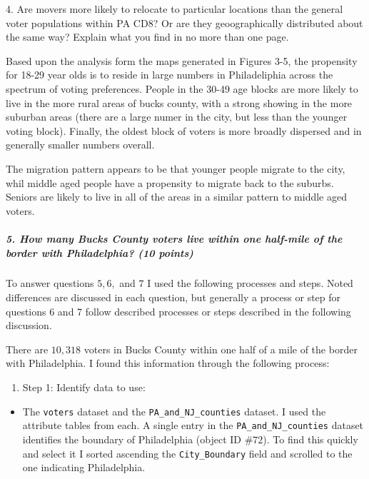 \documentclass[]{article}
\providecommand{\tightlist}{%
  \setlength{\itemsep}{0pt}\setlength{\parskip}{0pt}}
\let\oldsubparagraph\subparagraph
\renewcommand{\subparagraph}[1]{\oldsubparagraph{#1}\mbox{}}
\begin{document}
\clearpage

4. Are movers more likely to relocate to particular locations than the
general voter populations within PA CD8? Or are they geoographically
distributed about the same way? Explain what you find in no more than
one page.

Based upon the analysis form the maps generated in Figures 3-5, the
propensity for 18-29 year olds is to reside in large numbers in
Philadeliphia across the spectrum of voting preferences. People in the
30-49 age blocks are more likely to live in the more rural areas of
bucks county, with a strong showing in the more suburban areas (there
are a large numer in the city, but less than the younger voting block).
Finally, the oldest block of voters is more broadly dispersed and in
generally smaller numbers overall.

The migration pattern appears to be that younger people migrate to the
city, whil middle aged people have a propensity to migrate back to the
suburbs. Seniors are likely to live in all of the areas in a similar
pattern to middle aged voters.

\subparagraph{5. How many Bucks County voters live within one half-mile
of the border with Philadelphia? (10
points)}\label{how-many-bucks-county-voters-live-within-one-half-mile-of-the-border-with-philadelphia-10-points}

To answer questions \(5, 6,\) and \(7\) I used the following processes
and steps. Noted differences are discussed in each question, but
generally a process or step for questions 6 and 7 follow described
processes or steps described in the following discussion.

There are \(10,318\) voters in Bucks County within one half of a mile of
the border with Philadelphia. I found this information through the
following process:

\begin{enumerate}
\def\labelenumi{\alph{enumi}.}
\tightlist
\item
  Step 1: Identify data to use:
\end{enumerate}

\begin{itemize}
\tightlist
\item
  The \texttt{voters} dataset and the \texttt{PA\_and\_NJ\_counties}
  dataset. I used the attribute tables from each. A single entry in the
  \texttt{PA\_and\_NJ\_counties} dataset identifies the boundary of
  Philadelphia (object ID \#\(72\)). To find this quickly and select it
  I sorted ascending the \texttt{City\_Boundary} field and scrolled to
  the one indicating Philadelphia.
\end{itemize}
\end{document}

